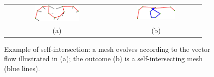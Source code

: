 \begin{figure}
 \begin{tabular}{cc}
  \includegraphics[width=0.45\textwidth]{./img/selfinters01}&
  \includegraphics[width=0.45\textwidth]{./img/selfinters02}\\
  (a)&(b)
 \end{tabular}
 \caption{Example of self-intersection: a mesh evolves according to the vector flow illustrated in (a); the outcome (b) is a self-intersecting mesh (blue lines).}
 \label{fig:selfint}
\end{figure}


